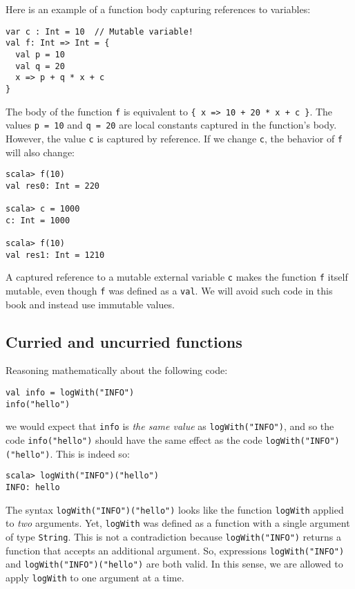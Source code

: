 Here is an example of a function body capturing references to variables:
\begin{lstlisting}
var c : Int = 10  // Mutable variable!
val f: Int => Int = {
  val p = 10
  val q = 20
  x => p + q * x + c
}
\end{lstlisting}
The body of the function \lstinline!f! is equivalent to \lstinline!{ x => 10 + 20 * x + c }!.
The values \lstinline!p = 10! and \lstinline!q = 20! are local constants
captured in the function\textsf{'}s body. However, the value \lstinline!c!
is captured by reference. If we change \lstinline!c!, the behavior
of \lstinline!f! will also change:
\begin{lstlisting}
scala> f(10)
val res0: Int = 220

scala> c = 1000
c: Int = 1000

scala> f(10)
val res1: Int = 1210 
\end{lstlisting}
A captured reference to a mutable external variable \lstinline!c!
makes the function \lstinline!f! itself mutable, even though \lstinline!f!
was defined as a \lstinline!val!. We will avoid such code in this
book and instead use immutable values.

\subsection{Curried and uncurried functions}

Reasoning mathematically about the following code:
\begin{lstlisting}
val info = logWith("INFO")
info("hello")
\end{lstlisting}
we would expect that \lstinline!info! is \emph{the same value} as
\lstinline!logWith("INFO")!, and so the code \lstinline!info("hello")!
should have the same effect as the code \lstinline!logWith("INFO")("hello")!.
This is indeed so:
\begin{lstlisting}
scala> logWith("INFO")("hello")
INFO: hello
\end{lstlisting}
The syntax \lstinline!logWith("INFO")("hello")! looks like the function
\lstinline!logWith! applied to \emph{two} arguments. Yet, \lstinline!logWith!
was defined as a function with a single argument of type \lstinline!String!.
This is not a contradiction because \lstinline!logWith("INFO")! returns
a function that accepts an additional argument. So, expressions \lstinline!logWith("INFO")!
and \lstinline!logWith("INFO")("hello")! are both valid. In this
sense, we are allowed to apply \lstinline!logWith! to one argument
at a time.

